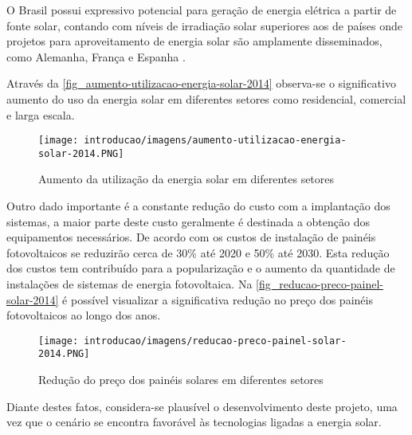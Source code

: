 \begin{citacao}
	O Brasil possui expressivo potencial para geração de energia elétrica a partir de fonte solar, contando com níveis de irradiação solar superiores aos de países onde projetos para aproveitamento de energia solar são amplamente disseminados, como Alemanha, França e Espanha \cite[p.~4]{nascimento2017energia}.
\end{citacao}

Através da \autoref{fig_aumento-utilizacao-energia-solar-2014} observa-se o significativo aumento do uso da energia solar em diferentes setores como residencial, comercial e larga escala.

\begin{figure}[htb]
	\caption{\label{fig_aumento-utilizacao-energia-solar-2014}Aumento da utilização da energia solar em diferentes setores}
	\begin{center}
		\texttt{[image: introducao/imagens/aumento-utilizacao-energia-solar-2014.PNG]}
	\end{center}
\end{figure}

Outro dado importante é a constante redução do custo com a implantação dos sistemas, a maior parte deste custo geralmente é destinada a obtenção dos equipamentos necessários. De acordo com  os custos de instalação de painéis fotovoltaicos se reduzirão cerca de 30\% até 2020 e 50\% até 2030. Esta redução dos custos tem contribuído para a popularização e o aumento da quantidade de instalações de sistemas de energia fotovoltaica. Na \autoref{fig_reducao-preco-painel-solar-2014} é possível visualizar a significativa redução no preço dos painéis fotovoltaicos ao longo dos anos.

\begin{figure}[htb]
	\caption{\label{fig_reducao-preco-painel-solar-2014}Redução do preço dos painéis solares em diferentes setores}
	\begin{center}
		\texttt{[image: introducao/imagens/reducao-preco-painel-solar-2014.PNG]}
	\end{center}
\end{figure}

Diante destes fatos, considera-se plausível o desenvolvimento deste projeto, uma vez que o cenário se encontra favorável às tecnologias ligadas a energia solar.

